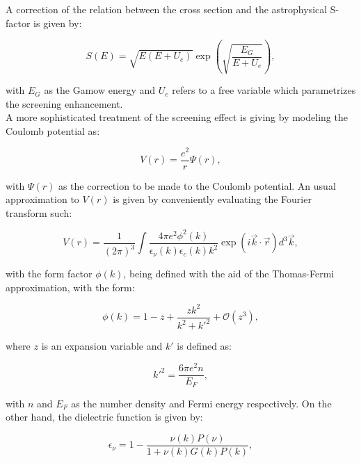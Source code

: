 \documentclass[openany]{book}
\begin{document}
A correction of the relation between the cross section and the astrophysical S-factor is given by:

\begin{equation}\label{eq:potential_screening_sFactor}
	S(E) = \sqrt{E(E+U_e)} \exp {\left( \sqrt{\frac{E_G}{E + U_e}}\right)},
\end{equation}

with $E_G$ as the Gamow energy and $U_e$ refers to a free variable which parametrizes the screening enhancement. \\

A more sophisticated treatment of the screening effect is giving by modeling the Coulomb potential as:

\begin{equation}\label{eq:potential_screening}
	V(r) = \frac{e^2}{r} \Psi(r),
\end{equation}

with $\Psi(r)$ as the correction to be made to the Coulomb potential. An usual approximation to $V(r)$ is given by conveniently evaluating the Fourier transform such:

\begin{equation}\label{eq:potential_screening_fourier}
	V(r) = \frac{1}{(2\pi)^3} \int \frac{4\pi e^2 \phi^2(k)}{\epsilon_\nu (k) \epsilon_c (k) k^2} \exp(i \vec k \cdot \vec r) d^3 \vec k,
\end{equation}

with the form factor $\phi(k)$, being defined with the aid of the Thomas-Fermi approximation, with the form: 

\begin{equation}\label{eq:potential_screening_formFactor}
	\phi(k) = 1 - z + \frac{zk^2}{k^2 + {k'}^2} + \mathcal{O}(z^3),
\end{equation}

where $z$ is an expansion variable and $k'$ is defined as: 

\begin{equation}\label{eq:potential_screening_kThomasFermi}
	{k'}^2 = \frac{6\pi e^2 n}{E_F},
\end{equation}

with $n$ and $E_F$ as the number density and Fermi energy respectively. On the other hand, the dielectric function is given by:

\begin{equation}\label{eq:potential_screening_dielectric}
	\epsilon_\nu = 1 - \frac{\nu(k) P(\nu)}{1 + \nu(k) G(k) P(k)},
\end{equation}
\end{document}
